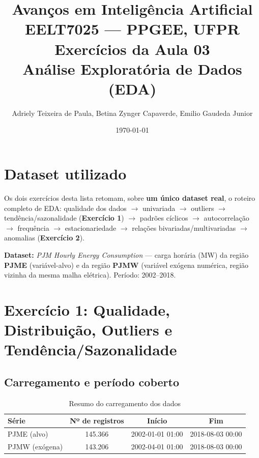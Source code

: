 \documentclass[12pt,a4paper]{article}
\title{
    \Large \textbf{Avanços em Inteligência Artificial} \\
    \large EELT7025 --- PPGEE, UFPR \\[0.3cm]
    \normalsize Exercícios da Aula 03 \\
    \normalsize Análise Exploratória de Dados (EDA)
}
\author{Adriely Teixeira de Paula, Betina Zynger Capaverde, Emilio Gaudeda Junior}
\date{\today}
\begin{document}
\maketitle
\tableofcontents
\newpage

\section*{Dataset utilizado}

Os dois exercícios desta lista retomam, sobre \textbf{um único dataset real}, o roteiro completo de EDA: qualidade dos dados $\rightarrow$ univariada $\rightarrow$ outliers $\rightarrow$ tendência/sazonalidade (\textbf{Exercício 1}) $\rightarrow$ padrões cíclicos $\rightarrow$ autocorrelação $\rightarrow$ frequência $\rightarrow$ estacionariedade $\rightarrow$ relações bivariadas/multivariadas $\rightarrow$ anomalias (\textbf{Exercício 2}).

\textbf{Dataset:} \emph{PJM Hourly Energy Consumption} --- carga horária (MW) da região \textbf{PJME} (variável-alvo) e da região \textbf{PJMW} (variável exógena numérica, região vizinha da mesma malha elétrica). Período: 2002--2018.

\newpage
\section{Exercício 1: Qualidade, Distribuição, Outliers e Tendência/Sazonalidade}

\subsection{Carregamento e período coberto}

\begin{table}[H]
\centering
\caption{Resumo do carregamento dos dados}
\begin{tabular}{lccc}
\toprule
Série & Nº de registros & Início & Fim \\
\midrule
PJME (alvo)     & 145.366 & 2002-01-01 01:00 & 2018-08-03 00:00 \\
PJMW (exógena)  & 143.206 & 2002-04-01 01:00 & 2018-08-03 00:00 \\
\bottomrule
\end{tabular}
\end{table}
\end{document}
